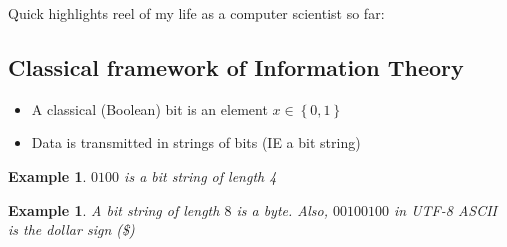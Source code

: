 \documentclass[12pt]{article}
\theoremstyle{plain}
\theoremstyle{nonumberplain}
\theoremstyle{plain}
\newtheorem{example}[lemma]{Example}
\theoremstyle{nonumberplain}
\newcommand\1{{\bf 1}}
\newcommand{\<}{\left\langle}
\renewcommand{\>}{\right\rangle}
\newcommand{\lb}{\left\{}
\newcommand{\rb}{\right\}}
\begin{document}
Quick highlights reel of my life as a computer scientist so far:


\subsection{Classical framework of Information Theory }
\begin{itemize}
\item A classical (Boolean) bit is an element $x\in \lb 0,1 \rb$
\item Data is transmitted in strings of bits (IE a bit string)
\end{itemize}

\begin{example}
$0100$ is a bit string of length 4
\end{example}

\begin{example}
A bit string of length $8$ is a \textit{byte}. Also, $00100100$ in UTF-8 ASCII is the dollar sign (\$)
\end{example}

\end{document}

